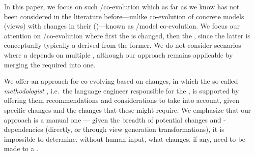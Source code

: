In this paper, we focus on such \metamodel/\viewtype co-evolution which as far as we know has not been considered in the literature before---unlike co-evolution of concrete models (views) with changes in their \metamodel (\viewtype)---known as \metamodel/model co-evolution.
We focus our attention on \metamodel/\viewtype co-evolution where first the \metamodel is changed, then the \viewtype, since the latter is conceptually typically a \metamodel derived from the former. %
We do not consider scenarios where a \viewtype depends on multiple \metamodels, although our approach remains applicable by merging the required \metamodels into one. %

We offer an approach for co-evolving \viewtypes based on \metamodel changes, in which the so-called \textit{methodologist} \cite{atkinson_orthographic_2010}, i.e.~the language engineer responsible for the \viewtype, is supported by offering them recommendations and considerations to take into account, given specific \metamodel changes and the \viewtype changes that these might require. We emphasize that our approach is a manual one --- given the breadth of potential \metamodel changes and \viewtypes-\metamodel dependencies (directly, or through view generation transformations), it is impossible to determine, without human input, what changes, if any, need to be made to a \viewtype.


